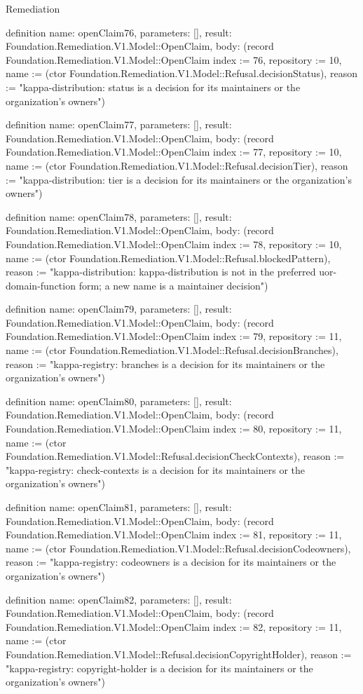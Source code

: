 \begin{lexlean}{Remediation}
\begin{semanticmodule}
definition{
  name: openClaim76,
  parameters: [],
  result: Foundation.Remediation.V1.Model::OpenClaim,
  body: (record Foundation.Remediation.V1.Model::OpenClaim {index := 76, repository := 10, name := (ctor Foundation.Remediation.V1.Model::Refusal.decisionStatus), reason := "kappa-distribution: status is a decision for its maintainers or the organization's owners"})
}

definition{
  name: openClaim77,
  parameters: [],
  result: Foundation.Remediation.V1.Model::OpenClaim,
  body: (record Foundation.Remediation.V1.Model::OpenClaim {index := 77, repository := 10, name := (ctor Foundation.Remediation.V1.Model::Refusal.decisionTier), reason := "kappa-distribution: tier is a decision for its maintainers or the organization's owners"})
}

definition{
  name: openClaim78,
  parameters: [],
  result: Foundation.Remediation.V1.Model::OpenClaim,
  body: (record Foundation.Remediation.V1.Model::OpenClaim {index := 78, repository := 10, name := (ctor Foundation.Remediation.V1.Model::Refusal.blockedPattern), reason := "kappa-distribution: kappa-distribution is not in the preferred uor-{domain}-{function} form; a new name is a maintainer decision"})
}

definition{
  name: openClaim79,
  parameters: [],
  result: Foundation.Remediation.V1.Model::OpenClaim,
  body: (record Foundation.Remediation.V1.Model::OpenClaim {index := 79, repository := 11, name := (ctor Foundation.Remediation.V1.Model::Refusal.decisionBranches), reason := "kappa-registry: branches is a decision for its maintainers or the organization's owners"})
}

definition{
  name: openClaim80,
  parameters: [],
  result: Foundation.Remediation.V1.Model::OpenClaim,
  body: (record Foundation.Remediation.V1.Model::OpenClaim {index := 80, repository := 11, name := (ctor Foundation.Remediation.V1.Model::Refusal.decisionCheckContexts), reason := "kappa-registry: check-contexts is a decision for its maintainers or the organization's owners"})
}

definition{
  name: openClaim81,
  parameters: [],
  result: Foundation.Remediation.V1.Model::OpenClaim,
  body: (record Foundation.Remediation.V1.Model::OpenClaim {index := 81, repository := 11, name := (ctor Foundation.Remediation.V1.Model::Refusal.decisionCodeowners), reason := "kappa-registry: codeowners is a decision for its maintainers or the organization's owners"})
}

definition{
  name: openClaim82,
  parameters: [],
  result: Foundation.Remediation.V1.Model::OpenClaim,
  body: (record Foundation.Remediation.V1.Model::OpenClaim {index := 82, repository := 11, name := (ctor Foundation.Remediation.V1.Model::Refusal.decisionCopyrightHolder), reason := "kappa-registry: copyright-holder is a decision for its maintainers or the organization's owners"})
}


\end{semanticmodule}
\end{lexlean}
